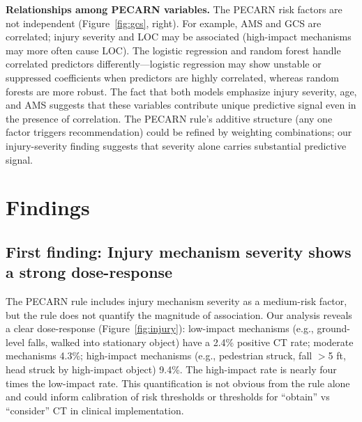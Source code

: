 \documentclass[10pt,letterpaper]{article}
\begin{document}
\textbf{Relationships among PECARN variables.} The PECARN risk factors are not independent (Figure~\ref{fig:gcs}, right). For example, AMS and GCS are correlated; injury severity and LOC may be associated (high-impact mechanisms may more often cause LOC). The logistic regression and random forest handle correlated predictors differently---logistic regression may show unstable or suppressed coefficients when predictors are highly correlated, whereas random forests are more robust. The fact that both models emphasize injury severity, age, and AMS suggests that these variables contribute unique predictive signal even in the presence of correlation. The PECARN rule's additive structure (any one factor triggers recommendation) could be refined by weighting combinations; our injury-severity finding suggests that severity alone carries substantial predictive signal.

\section{Findings}\label{findings}

\subsection{First finding: Injury mechanism severity shows a strong dose-response}\label{first-finding}

The PECARN rule includes injury mechanism severity as a medium-risk factor, but the rule does not quantify the magnitude of association. Our analysis reveals a clear dose-response (Figure~\ref{fig:injury}): low-impact mechanisms (e.g., ground-level falls, walked into stationary object) have a 2.4\% positive CT rate; moderate mechanisms 4.3\%; high-impact mechanisms (e.g., pedestrian struck, fall $>$5 ft, head struck by high-impact object) 9.4\%. The high-impact rate is nearly four times the low-impact rate. This quantification is not obvious from the rule alone and could inform calibration of risk thresholds or thresholds for ``obtain'' vs ``consider'' CT in clinical implementation.
\end{document}
